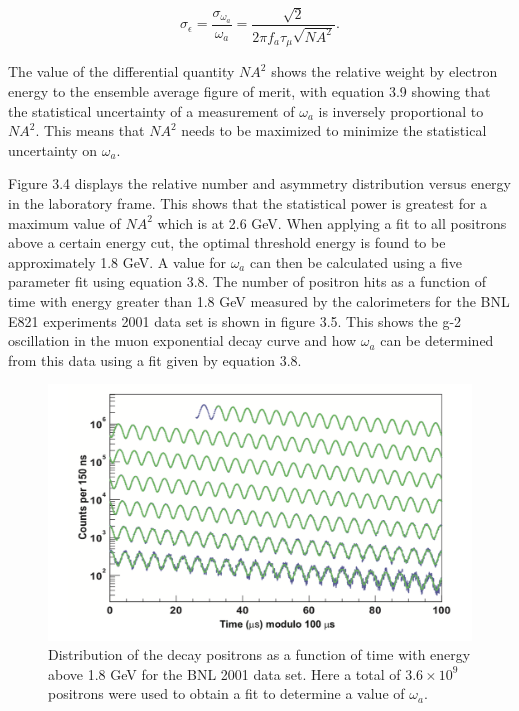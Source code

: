\begin{equation}
\sigma_{\epsilon} = \frac{\sigma_{\omega_{a}}}{\omega_{a}} = \frac{\sqrt{2}}{2\pi{f_{a}\tau_{\mu}}\sqrt{NA^2}}.
\end{equation}

The value of the differential quantity $NA^2$ shows the relative 
weight by electron energy to the ensemble average figure of merit, with equation 3.9 showing that the statistical uncertainty of a measurement of $\omega_{a}$ is inversely proportional to $NA^2$. This means that $NA^2$ needs to be maximized to minimize the statistical uncertainty on $\omega_{a}$\cite{Reference1}\cite{Reference29}.

Figure 3.4 displays the relative number and asymmetry distribution versus energy in the laboratory frame. This shows that the statistical power is greatest for a maximum value of $NA^2$ which is at 2.6 GeV. When applying a fit to all positrons above a certain energy cut, the optimal threshold energy is found to be approximately 1.8 GeV. A value for $\omega_{a}$ can then be calculated using a five parameter fit using equation 3.8. The number of positron hits as a function of time with energy greater than 1.8 GeV measured by the calorimeters for the BNL E821 experiments 2001 data set is shown in figure 3.5. This shows the g-2 oscillation in the muon exponential decay curve and how $\omega_{a}$ can be determined from this data using a fit given by equation 3.8. 

\begin{figure}[th]
\centering
\includegraphics[scale=0.65]{Figures/wiggle}
\decoRule
\caption{Distribution of the decay positrons as a function of time with energy above 1.8 GeV for the BNL 2001 data set. Here a total of $3.6\times10^9$ positrons were used to obtain a fit to determine a value of $\omega_{a}$.}
\label{fig:wiggle}
\end{figure}

